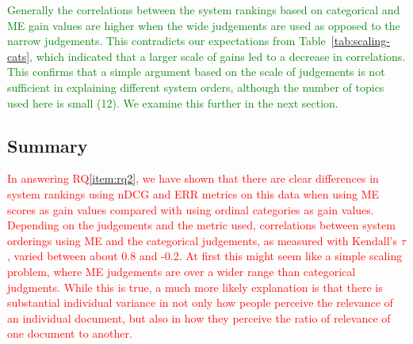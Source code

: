 \textcolor{green}{
Generally the correlations between the system rankings based on 
categorical and ME gain values are higher when the wide judgements
are used as opposed to the narrow judgements.
This contradicts our expectations from 
Table~\ref{tab:scaling-cats}, which indicated that
a larger scale of gains led to a decrease in correlations.
This confirms that a simple argument based on the scale 
of judgements is not sufficient in explaining different system orders, 
although the number of topics used here is small (12).
We examine this further in the next section.
}



\subsection{Summary}
\label{sec:summary-7}

\textcolor{red}{
In answering RQ\ref{item:rq2}, we have shown that there are clear
differences in system rankings using nDCG and ERR metrics on this data
when using ME scores as gain values compared with using ordinal
categories as gain values.
Depending on the judgements and the metric used, correlations between
system orderings using ME and the categorical judgements, as measured
with Kendall's $\tau$, varied between about 0.8 and -0.2. 
At first this might seem like a simple scaling problem, where 
ME judgements are over a wider range than categorical judgments.
While this is true, a much more likely explanation is that there is
substantial individual variance in not only how people perceive the
relevance of an individual document, but also in how they perceive the
ratio of relevance of one document to another.
}
 


